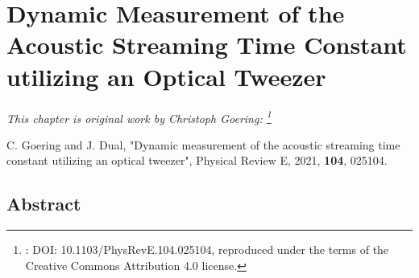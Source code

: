 \renewcommand{\relPath}{SECTION/30_Timeconstant}
 
\chapter[Dynamic Timeconstant Measurement]{Dynamic Measurement of the Acoustic 
Streaming Time Constant utilizing an Optical Tweezer}\label{ch:timeconstant}
\textit{This chapter is original work by Christoph Goering:
\footnote{: DOI: 10.1103/PhysRevE.104.025104, reproduced under the terms of the 
Creative Commons Attribution 4.0 license.}}

\vspace{5mm} \noindent
C. Goering and J. Dual, "Dynamic measurement of the acoustic streaming time 
constant utilizing an optical tweezer", Physical Review E, 2021, \textbf{104}, 
025104.


\section{Abstract}







